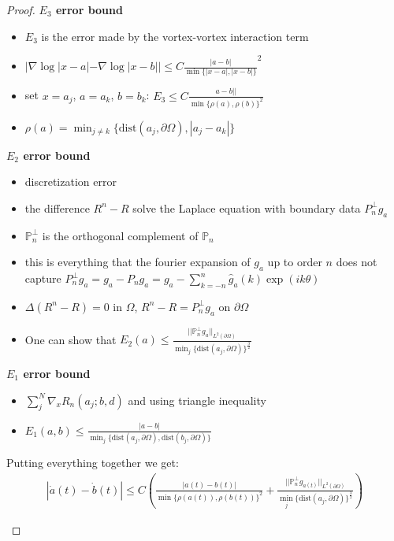 \documentclass[12pt, a4paper]{article}
\theoremstyle{plain}
\theoremstyle{definition}
\begin{document}
\begin{proof}
    \textbf{$E_3$ error bound}
    \begin{itemize}
        \item $E_3$ is the error made by the vortex-vortex interaction term
        \item $|\nabla \log |x-a| - \nabla \log |x-b|| \leq C \frac{|a-b|}{\min \{ |x-a|, |x-b|\}}^2$
        \item set $x = a_j$, $a=a_k$, $b=b_k$: $E_3 \leq C \frac{a-b||}{\min \{\rho(a), \rho(b)\}^2}$
        \item $\rho(a) = \min_{j\neq k} \{\text{dist}(a_j, \partial\Omega) , |a_j - a_k|\}$
    \end{itemize}
    \textbf{$E_2$ error bound}
    \begin{itemize}
        \item discretization error
        \item the difference $R^n - R$ solve the Laplace equation with boundary data $P^\perp_n g_a$
        \item $\mathbb P^\perp_n$ is the orthogonal complement of $\mathbb P_n$
        \item this is everything that the fourier expansion of $g_a$ up to order $n$ does not capture $P^\perp_n g_a = g_a - P_n g_a = g_a - \sum^n_{k=-n} \hat g_a(k) \exp (ik\theta)$
        \item $\Delta (R^n - R) = 0$ in $\Omega$, $R^n - R = P^\perp_n g_a$ on $\partial \Omega$
        \item One can show that $E_2(a) \leq \frac{||\mathbb P^\perp_n g_a||_{L^2(\partial \Omega)}}{\min_j \{\text{dist} (a_j , \partial \Omega)\}^\frac{3}{2}}$ 
    \end{itemize}
    \textbf{$E_1$ error bound}
    \begin{itemize}
        \item $\sum_j^N \nabla_x R_n (a_j; b, d)$ and using triangle inequality
        \item $E_1 (a,b) \leq \frac{|a-b|}{ \min_j \{\text{dist} (a_j , \partial \Omega), \text{dist}(b_j ,\partial \Omega)\}}$
    \end{itemize}
    Putting everything together we get:
    \begin{align}
        |\dot a(t) - \dot b(t)| \leq C (\frac{|a(t) - b(t)|}{\min \{\rho(a(t)), \rho(b(t))\}^2} + \frac{||\mathbb P^\perp_n g_{a(t)}||_{L^2(\partial \Omega)}}{\min_j \{\text{dist} (a_j , \partial \Omega)\}^\frac{3}{2}})
    \end{align}
    \begin{itemize}

\end{itemize}
\end{proof}
\end{document}
